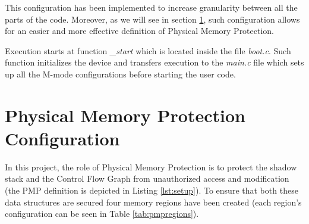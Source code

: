 This configuration has been implemented to increase granularity between all the parts
of the code. Moreover, as we will see in section \ref{sec:project_pmp}, such
configuration allows for an easier and more effective definition of Physical
Memory Protection.

Execution starts at function \textit{\_start} which is located inside the file \textit{boot.c}.
Such function initializes the device and transfers execution to the \textit{main.c}
file which sets up all the M-mode configurations before starting the user code.

\section{Physical Memory Protection Configuration}
\label{sec:project_pmp}

In this project, the role of Physical Memory Protection is to protect the shadow
stack and the Control Flow Graph from unauthorized access and modification (the PMP
definition is depicted in Listing \ref{lst:setup}). To ensure that both these data
structures are secured four memory regions have been created (each region's
configuration can be seen in Table \ref{tab:pmpregions}).

